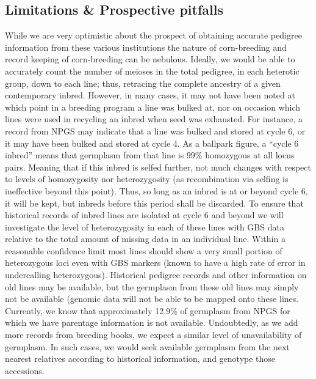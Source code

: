 \documentclass[draft,12pt]{article}
\begin{document}
\subsection*{Limitations \& Prospective pitfalls}
While we are very optimistic about the prospect of obtaining accurate pedigree information from these various institutions the nature of corn-breeding and record keeping of corn-breeding can be nebulous. 
Ideally, we would be able to accurately count the number of meioses in the total pedigree, in each heterotic group, down to each line; thus, retracing the complete ancestry of a given contemporary inbred. 
However, in many cases, it may not have been noted at which point in a breeding program a line was bulked at, nor on occasion which lines were used in recycling an inbred when seed was exhausted. 
For instance, a record from NPGS may indicate that a line was bulked and stored at cycle 6, or it may have been bulked and stored at cycle 4. As a ballpark figure, a ``cycle 6 inbred'' means that germplasm from that line is 99\% homozygous at all locus pairs. 
Meaning that if this inbred is selfed further, not much changes with respect to levels of homozygosity nor heterozygosity (as recombination via selfing is ineffective beyond this point).  
Thus, so long as an inbred is at or beyond cycle 6, it will be kept, but inbreds before this period shall be discarded.
To ensure that historical records of inbred lines are isolated at cycle 6 and beyond we will investigate the level of heterozygosity in each of these lines with GBS data relative to the total amount of missing data in an individual line. Within a reasonable confidence limit most lines should show a very small portion of heterozygous loci even with GBS markers (known to have a high rate of error in undercalling heterozygous). 
Historical pedigree records and other information on old lines may be available, but the germplasm from these old lines may simply not be available (genomic data will not be able to be mapped onto these lines. 
Currently, we know that approximately 12.9\% of germplasm from NPGS for which we have parentage information is not available. Undoubtedly, as we add more records from breeding books, we expect a similar level of unavailability of germplasm.  
In such cases, we would seek available germplasm from the next nearest relatives according to historical information, and genotype those accessions. 
\end{document}
